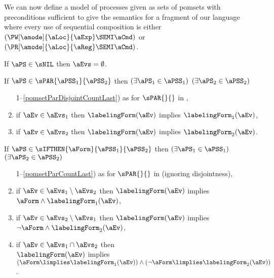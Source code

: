 We can now define a model of processes given as sets of pomsets with preconditions
sufficient to give the semantics for a fragment of our language
where every use of sequential composition is either
$(\PW[\amode]{\aLoc}{\aExp}\SEMI \aCmd)$ or
$(\PR[\amode]{\aLoc}{\aReg}\SEMI \aCmd)$.
\begin{definition}%
  \label{def:pomsets-pre}
  
  \noindent
  If $\aPS\in\sNIL$ then $\aEvs = \emptyset$.

  \noindent
  If $\aPS \in \sPAR{\aPSS_1}{\aPSS_2}$ then
  $(\exists\aPS_1\in\aPSS_1)$ $(\exists\aPS_2\in\aPSS_2)$
  \begin{enumerate}[topsep=0pt]
    \setcounter{enumi}{\value{pomsetParDisjointCount}}
  \item[1--\ref{pomsetParDisjointCountLast})]
    as for $\sPAR{}{}$ in ,
  \item \label{par-kappa1}
    if $\aEv\in\aEvs_1$ then $\labelingForm(\aEv)$ implies $\labelingForm_1(\aEv)$,
  \item \label{par-kappa2}
    if $\aEv\in\aEvs_2$ then $\labelingForm(\aEv)$ implies $\labelingForm_2(\aEv)$.
    \setcounter{pomsetPreParCount}{\value{enumi}}
  \end{enumerate}

  \noindent
  If $\aPS \in \sIFTHEN{\aForm}{\aPSS_1}{\aPSS_2}$ then
  $(\exists\aPS_1\in\aPSS_1)$ $(\exists\aPS_2\in\aPSS_2)$
  \begin{enumerate}[topsep=0pt]
    \setcounter{enumi}{\value{pomsetParCount}}
  \item[1--\ref{pomsetParCountLast})] 
    as for $\sPAR{}{}$  in  (ignoring disjointness),
  \item \label{if-kappa1}
    if $\aEv\in\aEvs_1\setminus\aEvs_2$ then $\labelingForm(\aEv)$ implies $\aForm\land\labelingForm_1(\aEv)$,
  \item \label{if-kappa2}
    if $\aEv\in\aEvs_2\setminus\aEvs_1$ then $\labelingForm(\aEv)$ implies $\neg\aForm\land\labelingForm_2(\aEv)$, 
  \item \label{if-kappa12}
    if $\aEv\in\aEvs_1\cap\aEvs_2$ then\\
    $\labelingForm(\aEv)$ implies $(\aForm\limplies\labelingForm_1(\aEv))\land(\neg\aForm\limplies\labelingForm_2(\aEv))$.
    \label{pomsetPreIfCountLast}
    \setcounter{pomsetPreIfCount}{\value{enumi}}
  \end{enumerate}


\end{definition}
